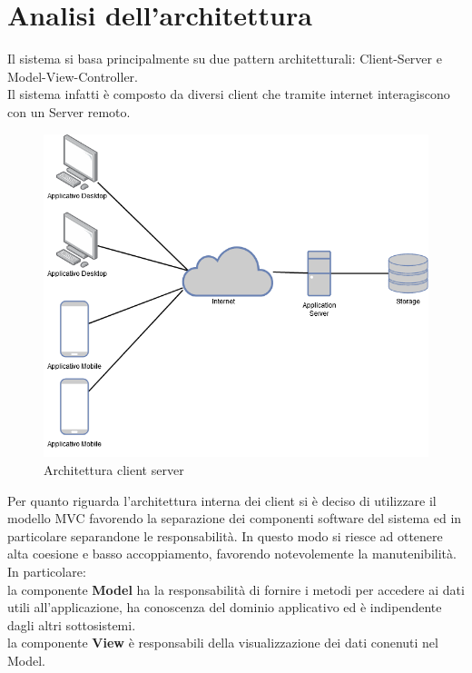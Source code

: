 \section{Analisi dell'architettura}
Il sistema si basa principalmente su due pattern architetturali: Client-Server e Model-View-Controller.\\
Il sistema infatti è composto da diversi client che tramite internet interagiscono con un Server remoto.
\begin{center}
    \begin{figure}[H]
        \includegraphics[width=\textwidth]{Figures/Architettura client server.png}
        \caption{Architettura client server}
    \end{figure}
\end{center}
Per quanto riguarda l'architettura interna dei client si è deciso di utilizzare il modello MVC
favorendo la separazione dei componenti software del sistema ed in particolare separandone le responsabilità.
In questo modo si riesce ad ottenere alta coesione e basso accoppiamento, favorendo notevolemente
la manutenibilità.\\
In particolare:\\
la componente \textbf{Model} ha la responsabilità di fornire i metodi per accedere
ai dati utili all'applicazione, ha conoscenza del dominio applicativo ed è indipendente
dagli altri sottosistemi.\\
la componente \textbf{View} è responsabili della visualizzazione dei dati conenuti nel Model.\\
